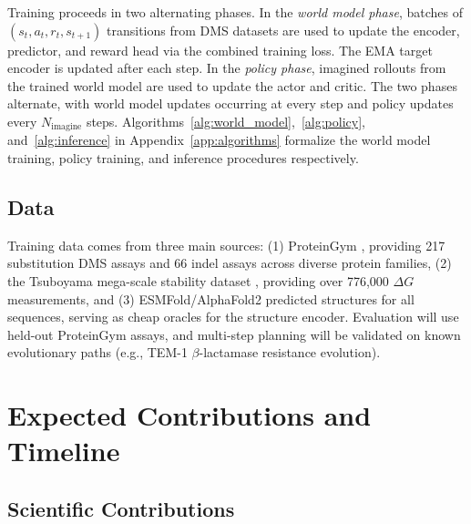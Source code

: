 \documentclass[12pt, a4paper]{article}
\begin{document}
Training proceeds in two alternating phases. In the \textit{world model phase}, batches of $(s_t, a_t, r_t, s_{t+1})$ transitions from DMS datasets are used to update the encoder, predictor, and reward head via the combined training loss. The EMA target encoder is updated after each step. In the \textit{policy phase}, imagined rollouts from the trained world model are used to update the actor and critic. The two phases alternate, with world model updates occurring at every step and policy updates every $N_\text{imagine}$ steps. Algorithms~\ref{alg:world_model},~\ref{alg:policy}, and~\ref{alg:inference} in Appendix~\ref{app:algorithms} formalize the world model training, policy training, and inference procedures respectively.

\subsection{Data}

Training data comes from three main sources: (1) ProteinGym \citep{notin2023proteingym}, providing 217 substitution DMS assays and 66 indel assays across diverse protein families, (2) the Tsuboyama mega-scale stability dataset \citep{tsuboyama2023megascale}, providing over 776,000 $\Delta G$ measurements, and (3) ESMFold/AlphaFold2 predicted structures for all sequences, serving as cheap oracles for the structure encoder. Evaluation will use held-out ProteinGym assays, and multi-step planning will be validated on known evolutionary paths (e.g., TEM-1 $\beta$-lactamase resistance evolution).


\section{Expected Contributions and Timeline}
\label{sec:contributions}

\subsection{Scientific Contributions}
\end{document}
